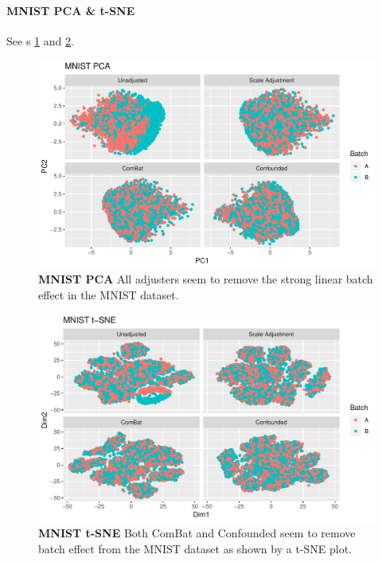 \documentclass{article}
\begin{document}
\paragraph{MNIST PCA \& t-SNE}

See \figurename{s} \ref{fig:pca} and \ref{fig:tsne}.

\begin{figure}
	\centering
	\includegraphics[width=\columnwidth]{figures/supplement/mnist_pca.pdf}
	\caption{\textbf{MNIST PCA}
	All adjusters seem to remove the strong linear batch effect in the MNIST dataset.
	}
	\label{fig:pca}
\end{figure}
\begin{figure}
	\centering
	\includegraphics[width=\columnwidth]{figures/supplement/mnist_tsne.pdf}
	\caption{\textbf{MNIST t-SNE}
	Both ComBat and Confounded seem to remove batch effect from the MNIST dataset as shown by a t-SNE plot.
	}
	\label{fig:tsne}
\end{figure}


\end{document}
